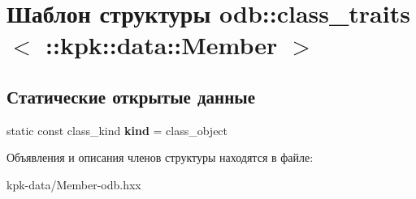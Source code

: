 \hypertarget{structodb_1_1class__traits_3_01_1_1kpk_1_1data_1_1_member_01_4}{}\section{Шаблон структуры odb\+:\+:class\+\_\+traits$<$ \+:\+:kpk\+:\+:data\+:\+:Member $>$}
\label{structodb_1_1class__traits_3_01_1_1kpk_1_1data_1_1_member_01_4}
\subsection*{Статические открытые данные}
\begin{DoxyCompactItemize}
\item 
static const class\+\_\+kind {\bfseries kind} = class\+\_\+object\hypertarget{structodb_1_1class__traits_3_01_1_1kpk_1_1data_1_1_member_01_4_a3ae5e68be3145c0b774d6a9c0cfbb479}{}\label{structodb_1_1class__traits_3_01_1_1kpk_1_1data_1_1_member_01_4_a3ae5e68be3145c0b774d6a9c0cfbb479}

\end{DoxyCompactItemize}


Объявления и описания членов структуры находятся в файле\+:\begin{DoxyCompactItemize}
\item 
kpk-\/data/Member-\/odb.\+hxx\end{DoxyCompactItemize}
